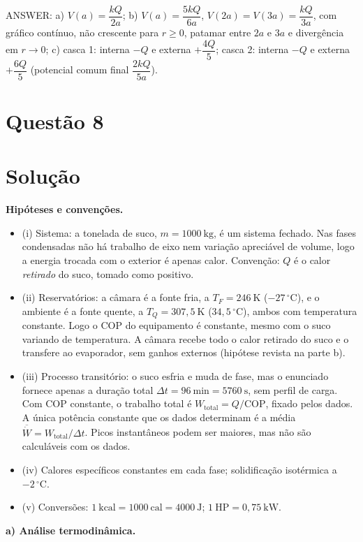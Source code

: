 \documentclass{article}%
\begin{document}
ANSWER: a) $V(a)=\dfrac{kQ}{2a}$; b) $V(a)=\dfrac{5kQ}{6a}$, $V(2a)=V(3a)=\dfrac{kQ}{3a}$, com gráfico contínuo, não crescente para $r\ge 0$, patamar entre $2a$ e $3a$ e divergência em $r\to 0$; c) casca 1: interna $-Q$ e externa $+\dfrac{4Q}{5}$; casca 2: interna $-Q$ e externa $+\dfrac{6Q}{5}$ (potencial comum final $\dfrac{2kQ}{5a}$).%
\newpage%
\section*{Questão 8}

\section*{Solução}

\textbf{Hipóteses e convenções.}
\begin{itemize}
\item (i) Sistema: a tonelada de suco, $m = 1000\ \text{kg}$, é um sistema fechado. Nas fases condensadas não há trabalho de eixo nem variação apreciável de volume, logo a energia trocada com o exterior é apenas calor. Convenção: $Q$ é o calor \emph{retirado} do suco, tomado como positivo.
\item (ii) Reservatórios: a câmara é a fonte fria, a $T_F = 246\ \text{K}$ ($-27\,^\circ$C), e o ambiente é a fonte quente, a $T_Q = 307{,}5\ \text{K}$ ($34{,}5\,^\circ$C), ambos com temperatura constante. Logo o COP do equipamento é constante, mesmo com o suco variando de temperatura. A câmara recebe todo o calor retirado do suco e o transfere ao evaporador, sem ganhos externos (hipótese revista na parte b).
\item (iii) Processo transitório: o suco esfria e muda de fase, mas o enunciado fornece apenas a duração total $\Delta t = 96\ \text{min} = 5760\ \text{s}$, sem perfil de carga. Com COP constante, o trabalho total é $W_{\text{total}} = Q/\text{COP}$, fixado pelos dados. A única potência constante que os dados determinam é a média $\overline{\dot W} = W_{\text{total}}/\Delta t$. Picos instantâneos podem ser maiores, mas não são calculáveis com os dados.
\item (iv) Calores específicos constantes em cada fase; solidificação isotérmica a $-2\,^\circ$C.
\item (v) Conversões: $1\ \text{kcal} = 1000\ \text{cal} = 4000\ \text{J}$; $1\ \text{HP} = 0{,}75\ \text{kW}$.
\end{itemize}

\textbf{a) Análise termodinâmica.}
\end{document}
